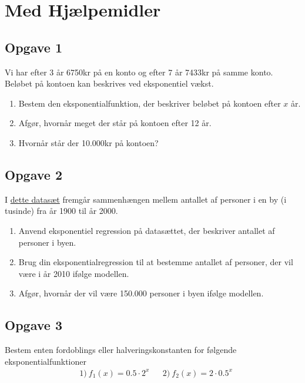 \documentclass[12pt]{article}
\begin{document}
\section*{Med Hjælpemidler}

\subsection*{Opgave 1}

Vi har efter 3 år 6750kr på en konto og efter 7 år 7433kr på samme konto. Beløbet på kontoen kan beskrives ved eksponentiel vækst.
\begin{enumerate}[label=\roman*)]
	\item Bestem den eksponentialfunktion, der beskriver beløbet på kontoen efter $x$ år.
	\item Afgør, hvornår meget der står på kontoen efter 12 år.
	\item Hvornår står der 10.000kr på kontoen?
\end{enumerate}

\subsection*{Opgave 2}

I \href{https://github.com/ChristianJLex/TeachingNotes/raw/master/2022-2023/Data%20og%20lign/Befolkningsdata.xlsx}{\color{blue!60} dette datasæt} fremgår sammenhængen mellem antallet af personer i en by (i tusinde) fra år 1900 til år 2000.

\begin{enumerate}[label=\roman*)]
	\item Anvend eksponentiel regression på datasættet, der beskriver antallet af personer i byen.
	\item Brug din eksponentialregression til at bestemme antallet af personer, der vil være i år 2010 ifølge modellen.
	\item Afgør, hvornår der vil være 150.000 personer i byen ifølge modellen. 
\end{enumerate}

\subsection*{Opgave 3}
Bestem enten fordoblings eller halveringskonstanten for følgende eksponentialfunktioner
\begin{align*}
	&1) \ f_1(x) = 0.5\cdot 2^x   &&2) \ f_2(x)=2\cdot 0.5^x  
\end{align*}
\end{document}
